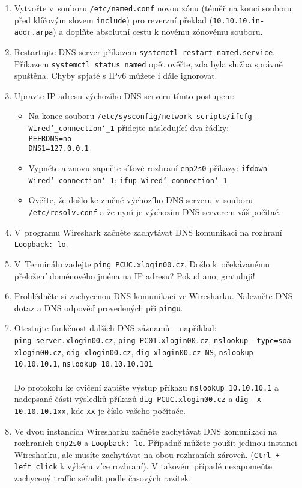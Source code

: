 \begin{enumerate}
  \item Vytvořte v~souboru {\tt /etc/named.conf} novou zónu (téměř na konci souboru před klíčovým slovem {\tt include}) pro reverzní překlad ({\tt 10.10.10.in-addr.arpa}) a doplňte absolutní cestu k novému zónovému souboru.
  
  \item Restartujte DNS server příkazem {\tt systemctl restart named.service}.
    Příkazem {\tt systemctl status named} opět ověřte, zda byla služba správně spuštěna. Chyby spjaté s IPv6 můžete i dále ignorovat.

  \item Upravte IP adresu výchozího DNS serveru tímto postupem:
  \begin{itemize}
    \item Na konec souboru {\tt /etc/sysconfig/network-scripts/ifcfg-Wired\char`_connection\char`_1} přidejte následující dva řádky:\\
          \verb|PEERDNS=no|\\
          \verb|DNS1=127.0.0.1|
    \item Vypněte a znovu zapněte síťové rozhraní {\tt enp2s0} příkazy: {\tt ifdown Wired\char`_connection\char`_1}; {\tt ifup Wired\char`_connection\char`_1}
    \item Ověřte, že došlo ke změně výchozího DNS serveru v~souboru {\tt /etc/resolv.conf} a že nyní je výchozím DNS serverem váš počítač.
  \end{itemize}
  \item V~programu Wireshark začněte zachytávat DNS komunikaci na rozhraní {\tt Loopback: lo}.
  \item V~Terminálu zadejte {\tt ping PCUC.xlogin00.cz}. Došlo k~očekávanému přeložení doménového jména na IP adresu? Pokud ano, gratuluji!
  \item Prohlédněte si zachycenou DNS komunikaci ve Wiresharku. Nalezněte DNS dotaz a DNS odpověď provedených při {\tt pingu}.
  \item Otestujte funkčnost dalších DNS záznamů -- například:\\
        {\tt ping server.xlogin00.cz}, {\tt ping PC01.xlogin00.cz}, {\tt nslookup -type=soa xlogin00.cz}, {\tt dig xlogin00.cz}, {\tt dig xlogin00.cz NS}, {\tt nslookup 10.10.10.1}, {\tt nslookup 10.10.10.101}\\
        \\
        Do protokolu ke cvičení zapište výstup příkazu {\tt nslookup 10.10.10.1} a nadepsané části výsledků příkazů {\tt dig PCUC.xlogin00.cz} a {\tt dig -x 10.10.10.1xx}, kde {\tt xx} je číslo vašeho počítače.
  \item Ve dvou instancích Wiresharku začněte zachytávat DNS komunikaci na rozhraních {\tt enp2s0} a {\tt Loopback: lo}. Případně můžete použít jedinou instanci Wiresharku, ale musíte zachytávat na obou rozhraních zároveň. (\texttt{Ctrl + left\_click} k výběru více rozhraní). V takovém případě nezapomeňte zachycený traffic seřadit podle časových razítek.
  

\end{enumerate}
